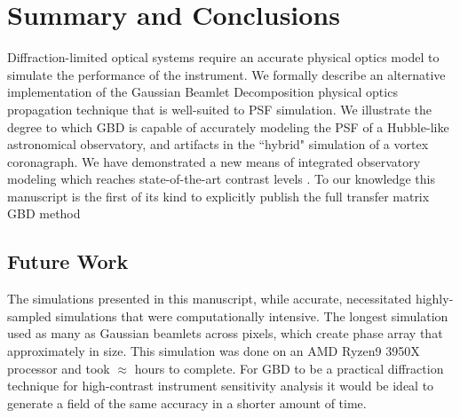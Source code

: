 \section{Summary and Conclusions}
\label{sec:conclusion}  %

Diffraction-limited optical systems require an accurate physical optics model to simulate the performance of the instrument. We formally describe an alternative implementation of the Gaussian Beamlet Decomposition physical optics propagation technique that is well-suited to PSF simulation. We illustrate the degree to which GBD is capable of accurately modeling the PSF of a Hubble-like astronomical observatory, and  artifacts  in the ``hybrid" simulation of a vortex coronagraph. We have demonstrated a new means of integrated observatory modeling which reaches  state-of-the-art contrast levels .
To our knowledge this manuscript is the first of its kind to explicitly publish the full transfer matrix GBD method  

\subsection{Future Work}
The simulations presented in this manuscript, while accurate, necessitated highly-sampled simulations that were computationally intensive. The longest simulation used as many as  Gaussian beamlets across  pixels, which create phase array that  approximately  in size. This simulation was done on an AMD Ryzen9 3950X processor and took $\approx$  hours to complete. 
For GBD to be a practical diffraction technique for high-contrast instrument sensitivity analysis it would be ideal to generate a field of the same accuracy in a shorter amount of time.  

